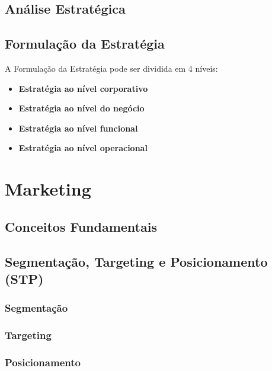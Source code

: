\documentclass[11pt]{article}
\begin{document}
\subsection{Análise Estratégica}



\subsection{Formulação da Estratégia}

A Formulação da Estratégia pode ser dividida em 4 níveis:
\begin{itemize}[topsep=0pt]
    \item \textbf{Estratégia ao nível corporativo}
    \item \textbf{Estratégia ao nível do negócio}
    \item \textbf{Estratégia ao nível funcional}
    \item \textbf{Estratégia ao nível operacional}
\end{itemize}



\newpage

\section{Marketing}

\subsection{Conceitos Fundamentais}



\subsection{Segmentação, Targeting e Posicionamento (STP)}

\subsubsection{Segmentação}

\subsubsection{Targeting}

\subsubsection{Posicionamento}
\end{document}
